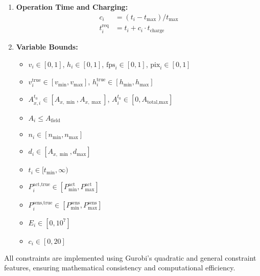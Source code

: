 \begin{enumerate}
    \item \textbf{Operation Time and Charging:}
    \begin{align}
        c_i &= (t_i - t_{\max}) / t_{\max} \\
        t_i^{\text{req}} &= t_i + c_i \cdot t_{\text{charge}}
    \end{align}

    \item \textbf{Variable Bounds:}
    \begin{itemize}
        \item $v_i \in [0,1]$, $h_i \in [0,1]$, $\text{fps}_i \in [0,1]$, $\text{pix}_i \in [0,1]$
        \item $v_i^{\text{true}} \in [v_{\min}, v_{\max}]$, $h_i^{\text{true}} \in [h_{\min}, h_{\max}]$
        \item $A_{x,i}^{t_0} \in [A_{x,\min}, A_{x,\max}]$, $A_{i}^{t_0} \in [0, A_{\text{total,max}}]$
        \item $A_i \leq A_{\text{field}}$
        \item $n_i \in [n_{\min}, n_{\max}]$
        \item $d_i \in [A_{x,\min}, d_{\max}]$
        \item $t_i \in [t_{\min}, \infty)$
        \item $P^{\text{act,true}}_i \in [P^{\text{act}}_{\min}, P^{\text{act}}_{\max}]$
        \item $P^{\text{sens,true}}_i \in [P^{\text{sens}}_{\min}, P^{\text{sens}}_{\max}]$
        \item $E_i \in [0, 10^7]$
        \item $c_i \in [0, 20]$
    \end{itemize}
\end{enumerate}

All constraints are implemented using Gurobi's quadratic and general constraint features, ensuring mathematical consistency and computational efficiency.
